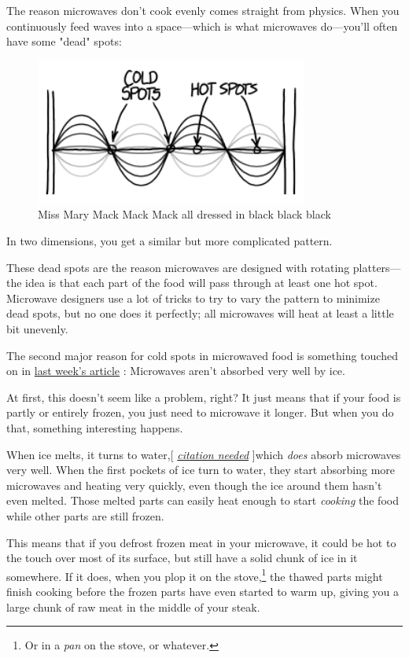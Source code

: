 {{The reason microwaves don't cook evenly comes straight from physics. When you continuously feed waves into a space—which is what microwaves do—you'll often have some "dead" spots:}

\begin{figure}[!htbp]
\centering
\includegraphics[scale=0.5, max width=0.8\textwidth]{imgs/a/131/standing.png}
\caption{Miss Mary Mack Mack Mack all dressed in black black black}
\end{figure}

{In two dimensions, you get a similar but more complicated pattern.}

{These dead spots are the reason microwaves are designed with rotating platters—the idea is that each part of the food will pass through at least one hot spot. Microwave designers use a lot of tricks to try to vary the pattern to minimize dead spots, but no one does it perfectly; all microwaves will heat at least a little bit unevenly.}

{The second major reason for cold spots in microwaved food is something touched on in \href{http://what-if.xkcd.com/130/}{last week's article} : Microwaves aren't absorbed very well by ice.}

{At first, this doesn't seem like a problem, right? It just means that if your food is partly or entirely frozen, you just need to microwave it longer. But when you do that, something interesting happens.}

{When ice melts, it turns to water,[ \emph{ \href{http://transportation.ky.gov/district-7/pages/citation-boulevard.aspx}{citation needed}} ]which \emph{does} absorb microwaves very well. When the first pockets of ice turn to water, they start absorbing more microwaves and heating very quickly, even though the ice around them hasn't even melted. Those melted parts can easily heat enough to start \emph{cooking} the food while other parts are still frozen.}

{This means that if you defrost frozen meat in your microwave, it could be hot to the touch over most of its surface, but still have a solid chunk of ice in it somewhere. If it does, when you plop it on the stove,{\footnote{Or in a \emph{pan} on the stove, or whatever.} } the thawed parts might finish cooking before the frozen parts have even started to warm up, giving you a large chunk of raw meat in the middle of your steak.}

}
